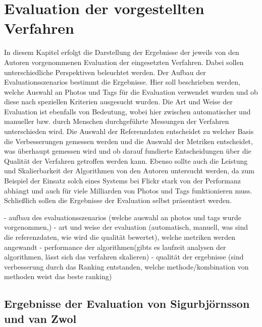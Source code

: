 \section{Evaluation der vorgestellten Verfahren} %
\label{sec:evaluation_der_verfahren}

In diesem Kapitel erfolgt die Darstellung der Ergebnisse der jeweils von den Autoren vorgenommenen Evaluation der eingesetzten Verfahren. Dabei sollen unterschiedliche Perspektiven beleuchtet werden. Der Aufbau der Evaluationsszenarios bestimmt die Ergebnisse. Hier soll beschrieben werden, welche Auswahl an Photos und Tags für die Evaluation verwendet wurden und ob diese nach speziellen Kriterien ausgesucht wurden. Die Art und Weise der Evaluation ist ebenfalls von Bedeutung, wobei hier zwischen automatischer und manueller bzw. durch Menschen durchgeführte Messungen der Verfahren unterschieden wird. Die Auswahl der Referenzdaten entscheidet zu welcher Basis die Verbesserungen gemessen werden und die Auswahl der Metriken entscheidet, was überhaupt gemessen wird und ob darauf fundierte Entscheidungen über die Qualität der Verfahren getroffen werden kann. Ebenso sollte auch die Leistung und Skalierbarkeit der Algorithmen von den Autoren untersucht werden, da zum Beispiel der Einsatz solch eines Systems bei Flickr stark von der Performanz abhängt und auch für viele Milliarden von Photos und Tags funktionieren muss. Schließlich sollen die Ergebnisse der Evaluation selbst präsentiert werden.

- aufbau des evaluationsszenarios (welche auswahl an photos und tags wurde vorgenommen,)
- art und weise der evaluation (automatisch, manuell, was sind die referenzdaten, wie wird die qualität bewertet), welche metriken werden angewandt
- performance der algorithmen(gibts es laufzeit analysen der algorithmen, lässt sich das verfahren skalieren)
- qualität der ergebnisse (sind verbesserung durch das Ranking entstanden, welche methode/kombination von methoden weist das beste ranking)

\subsection{Ergebnisse der Evaluation von Sigurbjörnsson und van Zwol} %
\label{sub:ergebnisse_der_evaluation_von_collectiveknowledge}

